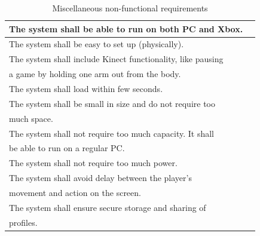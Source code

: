 \begin{table} [H]
\label{tab:nfunc}
\centering
    \begin{tabular}{|l|l|}
 
       \hline
The system shall be able to run on both PC and Xbox. \\ \hline
The system shall be easy to set up (physically).\\ \hline
The system shall include Kinect functionality, like pausing \\ a game by holding one arm out from the body. \\ \hline
The system shall load within few seconds.\\ \hline
The system shall be small in size and do not require too \\ much space.\\ \hline
The system shall not require too much capacity. It shall \\ be able to run on a regular PC. \\ \hline
The system shall not require too much power. \\ \hline
The system shall avoid delay between the player's \\ movement and action on the screen.\\ \hline
The system shall ensure secure storage and sharing of \\ profiles. \\ \hline
    \end{tabular}
    \caption[Miscellaneous non-functional requirements]{Miscellaneous non-functional requirements}
    \label{tab:agenda}
\end{table} 
